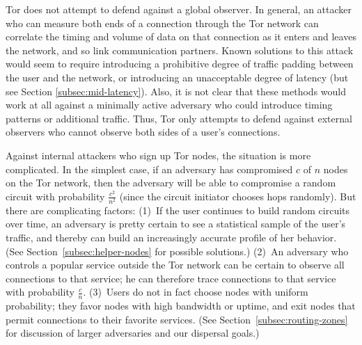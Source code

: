 \documentclass{llncs}
\begin{document}
Tor does not attempt to defend against a global observer.  In general, an
attacker who can measure both ends of a connection through the Tor network
can correlate the timing and volume of data on that connection as it enters
and leaves the network, and so link communication partners.
Known solutions to this attack would seem to require introducing a
prohibitive degree of traffic padding between the user and the network, or
introducing an unacceptable degree of latency (but see Section
\ref{subsec:mid-latency}).  Also, it is not clear that these methods would
work at all against a minimally active adversary who could introduce timing
patterns or additional traffic.  Thus, Tor only attempts to defend against
external observers who cannot observe both sides of a user's connections.


Against internal attackers who sign up Tor nodes, the situation is more
complicated.  In the simplest case, if an adversary has compromised $c$ of
$n$ nodes on the Tor network, then the adversary will be able to compromise
a random circuit with probability $\frac{c^2}{n^2}$ (since the circuit
initiator chooses hops randomly).  But there are
complicating factors:
(1)~If the user continues to build random circuits over time, an adversary
  is pretty certain to see a statistical sample of the user's traffic, and
  thereby can build an increasingly accurate profile of her behavior.  (See
  Section~\ref{subsec:helper-nodes} for possible solutions.)
(2)~An adversary who controls a popular service outside the Tor network
  can be certain to observe all connections to that service; he
  can therefore trace connections to that service with probability
  $\frac{c}{n}$.
(3)~Users do not in fact choose nodes with uniform probability; they
  favor nodes with high bandwidth or uptime, and exit nodes that
  permit connections to their favorite services.
(See Section~\ref{subsec:routing-zones} for discussion of larger
adversaries and our dispersal goals.)
\end{document}
